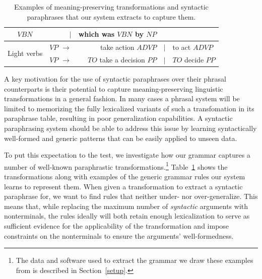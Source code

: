 \documentclass[11pt]{article}
\begin{document}
\begin{table}[!ht]
\begin{center}
\begin{tabular}{|c|rrcl|}
    $\mathit{VBN}$ & $\mid$ & which was $\mathit{VBN}$ by $\mathit{NP}$ \\
    \hline
    \multirow{2}{*}{Light verbs} & $\mathit{VP}$ $\rightarrow$ & take action $\mathit{ADVP}$ &
    $\mid$ & to act $\mathit{ADVP}$ \\
    & $\mathit{VP}$ $\rightarrow$ & $\mathit{TO}$ take a decision $\mathit{PP}$ &
    $\mid$ & $\mathit{TO}$ decide $\mathit{PP}$ \\
    \hline
\end{tabular}
\normalsize
\end{center}
\caption{Examples of meaning-preserving transformations and syntactic
  paraphrases that our system extracts to capture them.}
\label{example_rules}
\end{table}


A key motivation for the use of syntactic paraphrases over their
phrasal counterparts is their potential to capture meaning-preserving
linguistic transformations in a general fashion. In many cases a
phrasal system will be limited to memorizing the fully lexicalized
variants of such a transfomation in its paraphrase table, resulting in
poor generalization capabilities. A syntactic paraphrasing system
should be able to address this issue by learning syntactically
well-formed and generic patterns that can be easily applied to unseen
data.

To put this expectation to the test, we investigate how our grammar
captures a number of well-known paraphrastic
transformations.\footnote{The data and software used to extract the
  grammar we draw these examples from is described in
  Section~\ref{setup}.} Table~\ref{example_rules} shows the
transformations along with examples of the generic grammar rules our
system learns to represent them. When given a transformation to
extract a syntactic paraphrase for, we want to find rules that neither
under- nor over-generalize. This means that, while replacing the
maximum number of \emph{syntactic} arguments with nonterminals, the
rules ideally will both retain enough lexicalization to serve as
sufficient evidence for the applicability of the transformation and
impose constraints on the nonterminals to ensure the arguments'
well-formedness.
\end{document}
